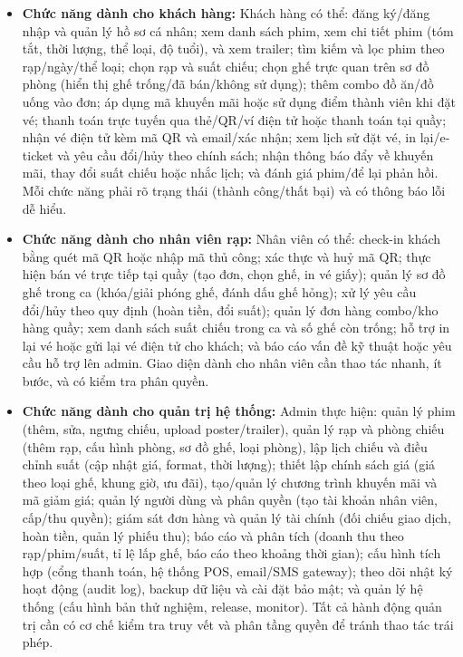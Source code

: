 \documentclass[a4paper]{article}
\begin{document}
\begin{itemize}
	\item \textbf{Chức năng dành cho khách hàng:} Khách hàng có thể: đăng ký/đăng nhập và quản lý hồ sơ cá nhân; xem danh sách phim, xem chi tiết phim (tóm tắt, thời lượng, thể loại, độ tuổi), và xem trailer; tìm kiếm và lọc phim theo rạp/ngày/thể loại; chọn rạp và suất chiếu; chọn ghế trực quan trên sơ đồ phòng (hiển thị ghế trống/đã bán/không sử dụng); thêm combo đồ ăn/đồ uống vào đơn; áp dụng mã khuyến mãi hoặc sử dụng điểm thành viên khi đặt vé; thanh toán trực tuyến qua thẻ/QR/ví điện tử hoặc thanh toán tại quầy; nhận vé điện tử kèm mã QR và email/xác nhận; xem lịch sử đặt vé, in lại/e-ticket và yêu cầu đổi/hủy theo chính sách; nhận thông báo đẩy về khuyến mãi, thay đổi suất chiếu hoặc nhắc lịch; và đánh giá phim/để lại phản hồi. Mỗi chức năng phải rõ trạng thái (thành công/thất bại) và có thông báo lỗi dễ hiểu.
	\item \textbf{Chức năng dành cho nhân viên rạp:} Nhân viên có thể: check-in khách bằng quét mã QR hoặc nhập mã thủ công; xác thực và huỷ mã QR; thực hiện bán vé trực tiếp tại quầy (tạo đơn, chọn ghế, in vé giấy); quản lý sơ đồ ghế trong ca (khóa/giải phóng ghế, đánh dấu ghế hỏng); xử lý yêu cầu đổi/hủy theo quy định (hoàn tiền, đổi suất); quản lý đơn hàng combo/kho hàng quầy; xem danh sách suất chiếu trong ca và số ghế còn trống; hỗ trợ in lại vé hoặc gửi lại vé điện tử cho khách; và báo cáo vấn đề kỹ thuật hoặc yêu cầu hỗ trợ lên admin. Giao diện dành cho nhân viên cần thao tác nhanh, ít bước, và có kiểm tra phân quyền.
	\item \textbf{Chức năng dành cho quản trị hệ thống:} Admin thực hiện: quản lý phim (thêm, sửa, ngưng chiếu, upload poster/trailer), quản lý rạp và phòng chiếu (thêm rạp, cấu hình phòng, sơ đồ ghế, loại phòng), lập lịch chiếu và điều chỉnh suất (cập nhật giá, format, thời lượng); thiết lập chính sách giá (giá theo loại ghế, khung giờ, ưu đãi), tạo/quản lý chương trình khuyến mãi và mã giảm giá; quản lý người dùng và phân quyền (tạo tài khoản nhân viên, cấp/thu quyền); giám sát đơn hàng và quản lý tài chính (đối chiếu giao dịch, hoàn tiền, quản lý phiếu thu); báo cáo và phân tích (doanh thu theo rạp/phim/suất, tỉ lệ lấp ghế, báo cáo theo khoảng thời gian); cấu hình tích hợp (cổng thanh toán, hệ thống POS, email/SMS gateway); theo dõi nhật ký hoạt động (audit log), backup dữ liệu và cài đặt bảo mật; và quản lý hệ thống (cấu hình bản thử nghiệm, release, monitor). Tất cả hành động quản trị cần có cơ chế kiểm tra truy vết và phân tầng quyền để tránh thao tác trái phép.
\end{itemize}
\end{document}
